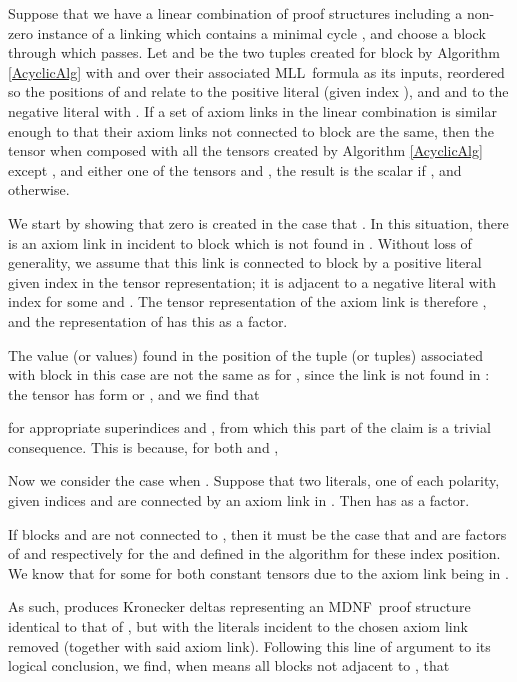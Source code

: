\documentclass{LMCS}
\theoremstyle{plain}\newtheorem*{cLm}{Claim}
\newcommand{\mll}{MLL} \newcommand{\mall}{MALL}
\newcommand{\p}{} \newcommand{\N}{\mathbb{N}}
\begin{document}
\begin{lem} \label{AcyclicClaim2}
Suppose that we have a linear combination of proof structures including a non-zero instance of a linking  which contains a minimal cycle , and choose a block  through which  passes. Let  and  be the two tuples created for block  by Algorithm \ref{AcyclicAlg} with  and  over their associated \mll~formula as its inputs, reordered so the  positions of  and  relate to the  positive literal (given index ), and  and  to the  negative literal with . If a set of axiom links  in the linear combination is similar enough to  that their axiom links not connected to block  are the same, then the tensor  when composed with all the tensors created by Algorithm \ref{AcyclicAlg} except , and either one of the tensors  and , the result is the scalar  if , and  otherwise.
\end{lem}
\proof
We start by showing that zero is created in the case that . In this situation, there is an axiom link in  incident to block  which is not found in . Without loss of generality, we assume that this link is connected to block  by a positive literal given index  in the tensor representation; it is adjacent to a negative literal with index  for some  and . The tensor representation of the axiom link is therefore , and the representation of  has this as a factor.

\p The value (or values) found in the  position of the tuple (or tuples) associated with block  in this case are not the same as  for , since the link is not found in : the tensor  has form  or , and we find that

for appropriate superindices  and , from which this part of the claim is a trivial consequence. This is because, for both  and ,


Now we consider the case when . Suppose that two literals, one of each polarity, given indices  and  are connected by an axiom link in . Then  has  as a factor.

\p If blocks  and  are not connected to , then it must be the case that  and  are factors of  and  respectively for the  and  defined in the algorithm for these index position. We know that  for some  for both constant tensors due to the axiom link being in .

As such,  produces Kronecker deltas representing an MDNF~proof structure identical to that of , but with the literals incident to the chosen axiom link removed (together with said axiom link). Following this line of argument to its logical conclusion, we find, when  means all blocks not adjacent to , that
\end{document}
